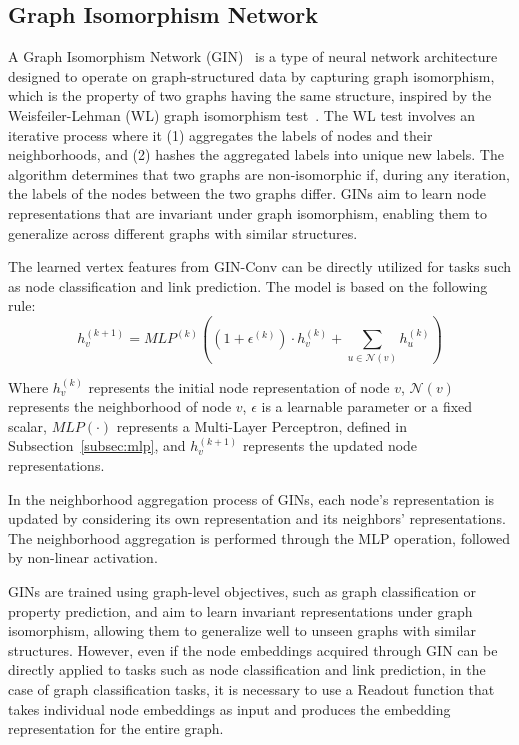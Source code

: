 \subsection{Graph Isomorphism Network}
\label{subsec:graph_isomorphism_network}%

A Graph Isomorphism Network (GIN)~\cite{xu2019powerful, daigavane2021understanding} is a type of neural network architecture designed to operate on graph-structured data by capturing graph isomorphism, which is the property of two graphs having the same structure, inspired by the Weisfeiler-Lehman (WL) graph isomorphism test~\cite{weisfeiler1968reduction}.
The WL test involves an iterative process where it (1) aggregates the labels of nodes and their neighborhoods, and (2) hashes the aggregated labels into unique new labels.
The algorithm determines that two graphs are non-isomorphic if, during any iteration, the labels of the nodes between the two graphs differ.
GINs aim to learn node representations that are invariant under graph isomorphism, enabling them to generalize across different graphs with similar structures.

The learned vertex features from GIN-Conv can be directly utilized for tasks such as node classification and link prediction.
The model is based on the following rule:
\begin{equation}
    \label{eq:gin_function}
    h_v^{(k+1)} = MLP^{(k)} \left( \left( 1 + \epsilon^{(k)} \right) \cdot h_v^{(k)} + \sum_{u \in \mathcal{N}(v)} h_u^{(k)} \right)
\end{equation}

Where $h_v^{(k)}$ represents the initial node representation of node $v$, $\mathcal{N}(v)$ represents the neighborhood of node $v$, $\epsilon$ is a learnable
parameter or a fixed scalar, $MLP( \cdot )$ represents a Multi-Layer Perceptron, defined in Subsection~\ref{subsec:mlp}, and $h_v^{(k+1)}$ represents the updated node representations.

In the neighborhood aggregation process of GINs, each node's representation is updated by considering its own representation and its neighbors' representations.
The neighborhood aggregation is performed through the MLP operation, followed by non-linear activation.

GINs are trained using graph-level objectives, such as graph classification or property prediction, and aim to learn invariant representations under graph isomorphism, allowing them to generalize well to unseen graphs with similar structures.
However, even if the node embeddings acquired through GIN can be directly applied to tasks such as node classification and link prediction, in the case of graph classification tasks, it is necessary to use a Readout function that takes individual node embeddings as input and produces the embedding representation for the entire graph.

